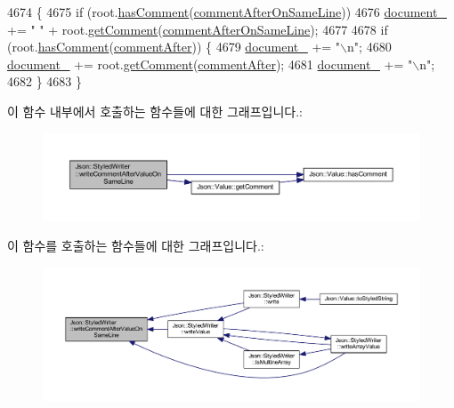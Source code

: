 \begin{DoxyCode}
4674                                                                      \{
4675   \textcolor{keywordflow}{if} (root.\hyperlink{class_json_1_1_value_a65d8e3ab6a5871cbd019a3e0f0b944a3}{hasComment}(\hyperlink{namespace_json_a4fc417c23905b2ae9e2c47d197a45351a008a230a0586de54f30b76afe70fdcfa}{commentAfterOnSameLine}))
4676     \hyperlink{class_json_1_1_styled_writer_ae967b0c77e4d7cb889ce7b6ee4ce28d7}{document\_} += \textcolor{stringliteral}{" "} + root.\hyperlink{class_json_1_1_value_a82817229a986f0b254e31d5c83066ffe}{getComment}(\hyperlink{namespace_json_a4fc417c23905b2ae9e2c47d197a45351a008a230a0586de54f30b76afe70fdcfa}{commentAfterOnSameLine});
4677 
4678   \textcolor{keywordflow}{if} (root.\hyperlink{class_json_1_1_value_a65d8e3ab6a5871cbd019a3e0f0b944a3}{hasComment}(\hyperlink{namespace_json_a4fc417c23905b2ae9e2c47d197a45351ac5784ca53b12250888ddb642b06aebef}{commentAfter})) \{
4679     \hyperlink{class_json_1_1_styled_writer_ae967b0c77e4d7cb889ce7b6ee4ce28d7}{document\_} += \textcolor{stringliteral}{"\(\backslash\)n"};
4680     \hyperlink{class_json_1_1_styled_writer_ae967b0c77e4d7cb889ce7b6ee4ce28d7}{document\_} += root.\hyperlink{class_json_1_1_value_a82817229a986f0b254e31d5c83066ffe}{getComment}(\hyperlink{namespace_json_a4fc417c23905b2ae9e2c47d197a45351ac5784ca53b12250888ddb642b06aebef}{commentAfter});
4681     \hyperlink{class_json_1_1_styled_writer_ae967b0c77e4d7cb889ce7b6ee4ce28d7}{document\_} += \textcolor{stringliteral}{"\(\backslash\)n"};
4682   \}
4683 \}
\end{DoxyCode}
이 함수 내부에서 호출하는 함수들에 대한 그래프입니다.\+:\nopagebreak
\begin{figure}[H]
\begin{center}
\leavevmode
\includegraphics[width=350pt]{class_json_1_1_styled_writer_ab12b274c62822fc51ec4617c6be95139_cgraph}
\end{center}
\end{figure}
이 함수를 호출하는 함수들에 대한 그래프입니다.\+:\nopagebreak
\begin{figure}[H]
\begin{center}
\leavevmode
\includegraphics[width=350pt]{class_json_1_1_styled_writer_ab12b274c62822fc51ec4617c6be95139_icgraph}
\end{center}
\end{figure}
